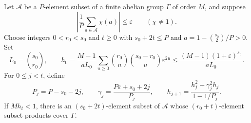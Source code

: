 \begin{lemma}
\label{lem:fixed-weight-product-completion}
Let $\mathcal A$ be a $P$-element subset of a finite abelian group
$\Gamma$ of order $M$, and suppose
\[
 \left|\frac1P\sum_{a\in\mathcal A}\chi(a)\right|\le\varepsilon
 \qquad(\chi\ne1).
\]
Choose integers $0<r_0<s_0$ and $t\ge0$ with $s_0+2t\le P$ and
$a=1-\binom{s_0}{2}/P>0$.  Set
\[
 L_0=\binom{s_0}{r_0},\qquad
 h_0=\frac{M-1}{aL_0}
 \sum_{u\ge0}\binom{r_0}{u}\binom{s_0-r_0}{u}\varepsilon^{2u}
 \le\frac{(M-1)(1+\varepsilon)^{s_0}}{aL_0}.
\]
For $0\le j<t$, define
\[
 P_j=P-s_0-2j,\qquad
 \gamma_j=\frac{P\varepsilon+s_0+2j}{P_j},\qquad
 h_{j+1}=\frac{h_j^2+\gamma_j^2h_j}{1-1/P_j}.
\]
If $Mh_t<1$, there is an $(s_0+2t)$-element subset of $\mathcal A$
whose $(r_0+t)$-element subset products cover $\Gamma$.
\end{lemma}
